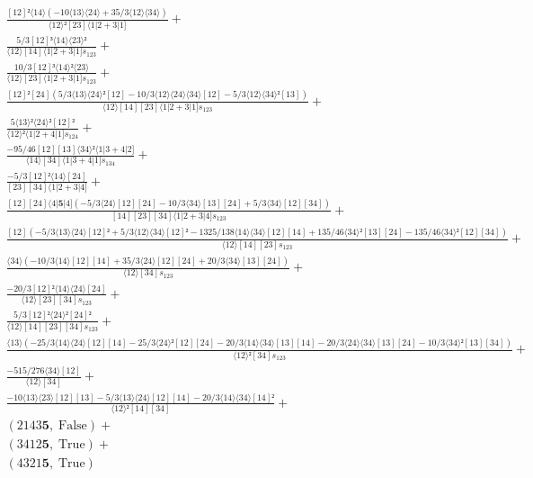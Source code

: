 \documentclass[varwidth, border=5pt]{standalone}
\begin{document}
\begin{my}
$\begin{gathered}
\scriptscriptstyle\frac{[12]²⟨14⟩(-10⟨13⟩⟨24⟩+35/3⟨12⟩⟨34⟩)}{⟨12⟩²[23]⟨1|2+3|1]} +\\
\scriptscriptstyle\frac{5/3[12]³⟨14⟩⟨23⟩²}{⟨12⟩[14]⟨1|2+3|1]s_{123}} +\\
\scriptscriptstyle\frac{10/3[12]³⟨14⟩²⟨23⟩}{⟨12⟩[23]⟨1|2+3|1]s_{123}} +\\
\scriptscriptstyle\frac{[12]²[24](5/3⟨13⟩⟨24⟩²[12]-10/3⟨12⟩⟨24⟩⟨34⟩[12]-5/3⟨12⟩⟨34⟩²[13])}{⟨12⟩[14][23]⟨1|2+3|1]s_{123}} +\\
\scriptscriptstyle\frac{5⟨13⟩²⟨24⟩²[12]²}{⟨12⟩²⟨1|2+4|1]s_{124}} +\\
\scriptscriptstyle\frac{-95/46[12][13]⟨34⟩²⟨1|3+4|2]}{⟨14⟩[34]⟨1|3+4|1]s_{134}} +\\
\scriptscriptstyle\frac{-5/3[12]²⟨14⟩[24]}{[23][34]⟨1|2+3|4]} +\\
\scriptscriptstyle\frac{[12][24]⟨4|𝟓|4](-5/3⟨24⟩[12][24]-10/3⟨34⟩[13][24]+5/3⟨34⟩[12][34])}{[14][23][34]⟨1|2+3|4]s_{123}} +\\
\scriptscriptstyle\frac{[12](-5/3⟨13⟩⟨24⟩[12]²+5/3⟨12⟩⟨34⟩[12]²-1325/138⟨14⟩⟨34⟩[12][14]+135/46⟨34⟩²[13][24]-135/46⟨34⟩²[12][34])}{⟨12⟩[14][23]s_{123}} +\\
\scriptscriptstyle\frac{⟨34⟩(-10/3⟨14⟩[12][14]+35/3⟨24⟩[12][24]+20/3⟨34⟩[13][24])}{⟨12⟩[34]s_{123}} +\\
\scriptscriptstyle\frac{-20/3[12]²⟨14⟩⟨24⟩[24]}{⟨12⟩[23][34]s_{123}} +\\
\scriptscriptstyle\frac{5/3[12]²⟨24⟩²[24]²}{⟨12⟩[14][23][34]s_{123}} +\\
\scriptscriptstyle\frac{⟨13⟩(-25/3⟨14⟩⟨24⟩[12][14]-25/3⟨24⟩²[12][24]-20/3⟨14⟩⟨34⟩[13][14]-20/3⟨24⟩⟨34⟩[13][24]-10/3⟨34⟩²[13][34])}{⟨12⟩²[34]s_{123}} +\\
\scriptscriptstyle\frac{-515/276⟨34⟩[12]}{⟨12⟩[34]} +\\
\scriptscriptstyle\frac{-10⟨13⟩⟨23⟩[12][13]-5/3⟨13⟩⟨24⟩[12][14]-20/3⟨14⟩⟨34⟩[14]²}{⟨12⟩²[14][34]} +\\
\scriptscriptstyle(2143𝟓,\;\text{False}) +\\
\scriptscriptstyle(3412𝟓,\;\text{True}) +\\
\scriptscriptstyle(4321𝟓,\;\text{True}) \phantom{+}
\end{gathered}$
\end{my}
\end{document}
